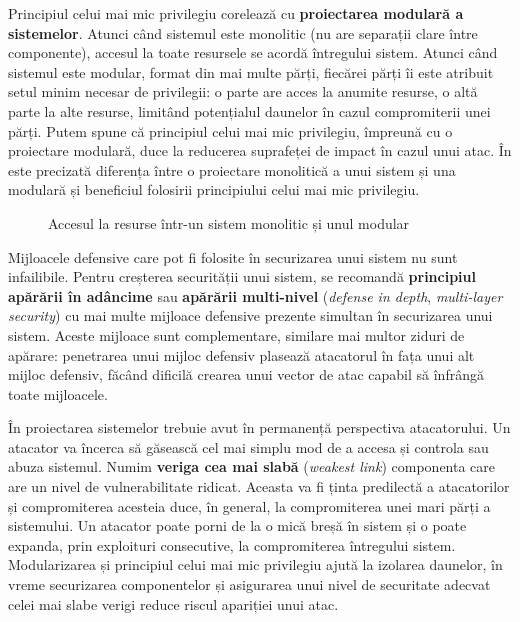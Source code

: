 Principiul celui mai mic privilegiu corelează cu \textbf{proiectarea modulară a sistemelor}. Atunci când sistemul este monolitic (nu are separații clare între componente), accesul la toate resursele se acordă întregului sistem. Atunci când sistemul este modular, format din mai multe părți, fiecărei părți îi este atribuit setul minim necesar de privilegii: o parte are acces la anumite resurse, o altă parte la alte resurse, limitând potențialul daunelor în cazul compromiterii unei părți. Putem spune că principiul celui mai mic privilegiu, împreună cu o proiectare modulară, duce la reducerea suprafeței de impact în cazul unui atac. În  este precizată diferența între o proiectare monolitică a unui sistem și una modulară și beneficiul folosirii principiului celui mai mic privilegiu.

\begin{figure}[htbp]
  \centering
  \def\svgwidth{\columnwidth}
  
  \caption{Accesul la resurse într-un sistem monolitic și unul modular}
  \label{fig:sec:modular-vs-monolithic}
\end{figure}

Mijloacele defensive care pot fi folosite în securizarea unui sistem nu sunt infailibile. Pentru creșterea securității unui sistem, se recomandă \textbf{principiul apărării în adâncime} sau \textbf{apărării multi-nivel} (\textit{defense in depth}, \textit{multi-layer security}) cu mai multe mijloace defensive prezente simultan în securizarea unui sistem. Aceste mijloace sunt complementare, similare mai multor ziduri de apărare: penetrarea unui mijloc defensiv plasează atacatorul în fața unui alt mijloc defensiv, făcând dificilă crearea unui vector de atac capabil să înfrângă toate mijloacele.

În proiectarea sistemelor trebuie avut în permanență perspectiva atacatorului. Un atacator va încerca să găsească cel mai simplu mod de a accesa și controla sau abuza sistemul. Numim \textbf{veriga cea mai slabă} (\textit{weakest link}) componenta care are un nivel de vulnerabilitate ridicat. Aceasta va fi ținta predilectă a atacatorilor și compromiterea acesteia duce, în general, la compromiterea unei mari părți a sistemului. Un atacator poate porni de la o mică breșă în sistem și o poate expanda, prin exploituri consecutive, la compromiterea întregului sistem. Modularizarea și principiul celui mai mic privilegiu ajută la izolarea daunelor, în vreme securizarea componentelor și asigurarea unui nivel de securitate adecvat celei mai slabe verigi reduce riscul apariției unui atac.

